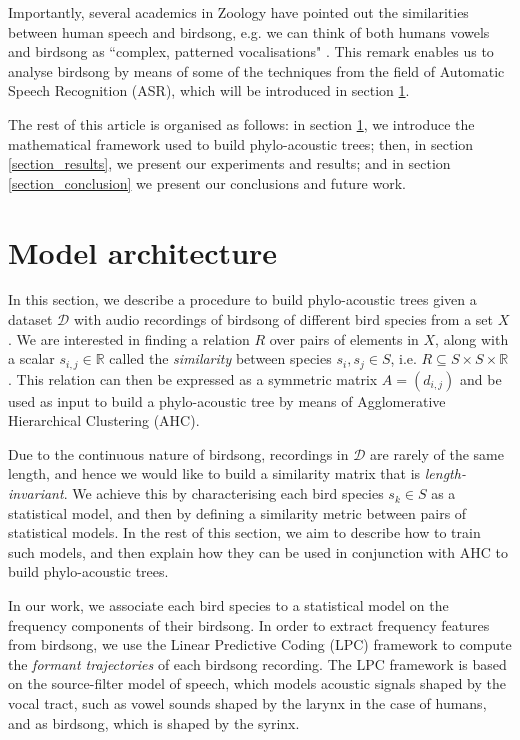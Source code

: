 \documentclass[pdftex,11pt,a4paper]{article}
\theoremstyle{definition}
\theoremstyle{remark}
\begin{document}
\par Importantly, several academics in Zoology have pointed out the similarities between human speech and birdsong, e.g. we can think of both humans vowels and birdsong as ``complex, patterned vocalisations" \cite{Berwick2013,Naguib2014}. This remark enables us to analyse birdsong by means of some of the techniques from the field of Automatic Speech Recognition (ASR), which will be introduced in section \ref{section_model}. 
\par The rest of this article is organised as follows: in section \ref{section_model}, we introduce the mathematical framework used to build phylo-acoustic trees; then, in section \ref{section_results}, we present our experiments and results; and in section \ref{section_conclusion} we present our conclusions and future work.

\section{Model architecture}
\label{section_model}
In this section, we describe a procedure to build phylo-acoustic trees given a dataset $\mathcal{D}$ with audio recordings of birdsong of different bird species from a set $X$. We are interested in finding a relation $R$ over pairs of elements in $X$, along with a scalar $s_{i, j} \in \mathbb{R}$ called the \emph{similarity} between species $s_i, s_j \in S$, i.e. $R \subseteq S \times S \times \mathbb{R}$. This relation can then be expressed as a symmetric matrix $A = (d_{i,j})$ and be used as input to build a phylo-acoustic tree by means of Agglomerative Hierarchical Clustering (AHC). 
\par Due to the continuous nature of birdsong, recordings in $\mathcal{D}$ are rarely of the same length, and hence we would like to build a similarity matrix that is \emph{length-invariant}. We achieve this by characterising each bird species $s_k \in S$ as a statistical model, and then by defining a similarity metric between pairs of statistical models. In the rest of this section, we aim to describe how to train such models, and then explain how they can be used in conjunction with AHC to build phylo-acoustic trees.
\par In our work, we associate each bird species to a statistical model on the frequency components of their birdsong. In order to extract frequency features from birdsong, we use the Linear Predictive Coding (LPC) framework to compute the \emph{formant trajectories} of each birdsong recording. The LPC framework is based on the source-filter model of speech, which models acoustic signals shaped by the vocal tract, such as vowel sounds shaped by the larynx in the case of humans, and as birdsong, which is shaped by the syrinx.
\end{document}
